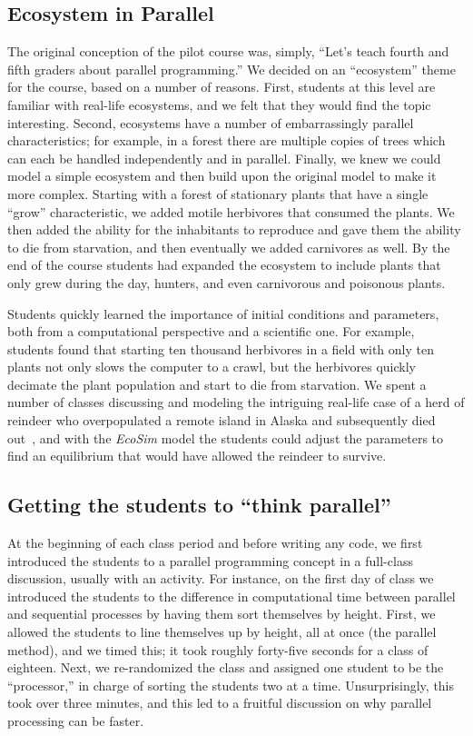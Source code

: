 \documentclass{sig-alternate}
\begin{document}
\subsection{Ecosystem in Parallel}
The original conception of the pilot course was, simply, ``Let's teach fourth and fifth graders
about parallel programming.''  We decided on an ``ecosystem'' theme for the course, based on a
number of reasons.  First, students at this level are familiar with real-life ecosystems, and we
felt that they would find the topic interesting.  Second, ecosystems have a number of 
embarrassingly parallel characteristics; for example, in a forest there are multiple copies
of trees which can each be handled independently and in parallel.  
Finally, we knew we could model a simple ecosystem 
and then build upon the original model to make it more complex.  Starting with a forest of
stationary plants that have a single ``grow'' characteristic, we added motile herbivores that
consumed the plants.  We then added the ability for the inhabitants to reproduce and gave them
the ability to die from starvation, and then eventually we added carnivores as well.  
By the end of the course students had expanded the ecosystem to include plants that only
grew during the day, hunters, and even carnivorous and poisonous plants.  

Students quickly learned the importance of initial conditions and parameters, both from a 
computational perspective and a scientific one.  For example, students found that starting 
ten thousand herbivores in a field with only ten plants
not only slows the computer to a crawl, but the herbivores quickly decimate the plant population
and start to die from starvation.  We spent a number of classes discussing and
modeling the intriguing real-life case of a herd of reindeer who overpopulated a remote
island in Alaska and subsequently died out~\cite{klein1968introduction,stMatthewIsland}, 
and with the \emph{EcoSim} model the students could adjust the parameters to find an
equilibrium that would have allowed the reindeer to survive.

\subsection{Getting the students to ``think parallel''}
At the beginning of each class period and before writing any code, we first introduced the 
students to a parallel programming concept in a full-class discussion, usually with an activity.
For instance, on the first day of class we introduced the students to the difference in
computational time between parallel and sequential processes by having them sort themselves
by height.  First, we allowed the students to line themselves up by height, all at once (the
parallel method), and we timed this; it took roughly forty-five seconds for a class of eighteen.
Next, we re-randomized the class and assigned one student to be the ``processor,'' in charge
of sorting the students two at a time.  Unsurprisingly, this took over three minutes, and this
led to a fruitful discussion on why parallel processing can be faster.
\end{document}
